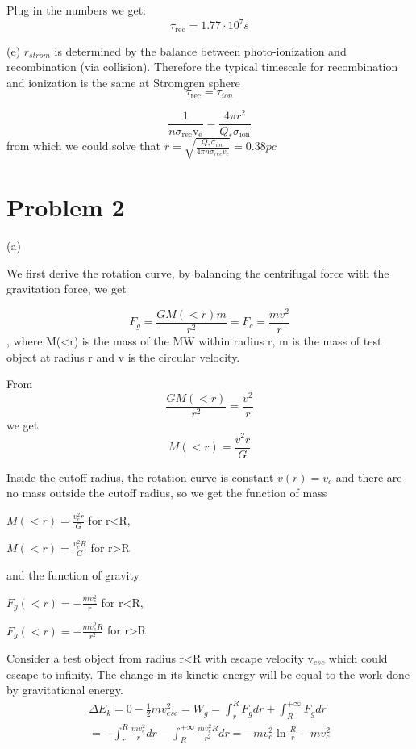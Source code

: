\documentclass{article}
\begin{document}
Plug in the numbers we get:
$$
\tau_{\mathrm{rec}} = 1.77\cdot10^7s
$$

(e)
$r_{strom}$ is determined by the balance between photo-ionization and recombination (via collision). Therefore the typical timescale for recombination and ionization is the same at Stromgren sphere
$$
\tau_{\mathrm{rec}} = \tau_{ion}
$$

$$
\frac{1}{n \sigma_{\mathrm{rec}} \mathrm{v}_{\mathrm{e}}} = \frac{4 \pi r^2}{Q_* \sigma_{\mathrm{ion}}}
$$
from which we could solve that 
$r = \sqrt{\frac{Q_* \sigma_{ion}}{4 \pi n \sigma_{rec} v_e}} = 0.38pc$







\section{Problem 2}

(a)

We first derive the rotation curve, by balancing the centrifugal force with the gravitation force, we get

$$
F_g = \frac{GM(<r)m}{r^2} = F_c = \frac{m v^2}{r}
$$,
where M(<r) is the mass of the MW within radius r, m is the mass of test object at radius r and v is the circular velocity.

From $$
\frac{GM(<r)}{r^2} = \frac{v^2}{r}
$$
we get
$$
M(<r) = \frac{v^2 r}{G} 
$$

Inside the cutoff radius, the rotation curve is constant $v(r) = v_c$ and there are no mass outside the cutoff radius, so we get the function of mass 

$M(<r) = \frac{v_c^2 r}{G}$ for r<R,

$M(<r) = \frac{v_c^2 R}{G}$ for r>R

and the function of gravity 

$F_g(<r) = -\frac{m v_c^2}{r}$ for r<R,

$F_g(<r) = -\frac{m v_c^2 R}{r^2}$ for r>R

Consider a test object from radius r<R with escape velocity v$_{esc}$ which could escape to infinity. The change in its kinetic energy will be equal to the work done by gravitational energy.
$$
\begin{aligned}
    \Delta E_k = 0 - \frac{1}{2}m v_{esc}^2= W_g = \int_r^R F_g dr + \int_R^{+\infty} F_g dr  \\
    = -\int_r^R \frac{m v_c^2}{r} dr - \int_R^{+\infty} \frac{m v_c^2 R}{r^2} dr 
    = -m v_c^2 \ln\frac{R}{r} - m v_c^2
\end{aligned}
$$
    
\end{document}
